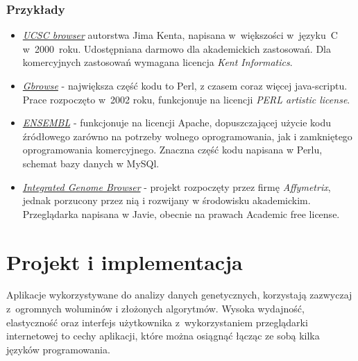 \documentclass[a4paper,12pt,oneside]{mwrep}  %
\begin{document}
\subsection{Przykłady}
\begin{itemize}
\item \href{https://genome.ucsc.edu}{\emph{UCSC browser}} \label{UCSC}
autorstwa Jima Kenta, napisana w~większości w~języku~C w~2000~roku. Udostępniana darmowo dla akademickich zastosowań. Dla komercyjnych zastosowań wymagana licencja \emph{Kent Informatics}.
\item \href{http://gbrowse.org}{\emph{Gbrowse}} - \label{Gbrowse}
największa część kodu to Perl, z czasem coraz więcej java-scriptu. Prace rozpoczęto w~2002 roku, funkcjonuje na licencji \emph{PERL artistic license}.
\item \href{http://www.ensembl.org}{\emph{ENSEMBL}} \label{ENSEMBL}
- funkcjonuje na licencji Apache, dopuszczającej użycie kodu źródłowego zarówno na potrzeby wolnego oprogramowania, jak i zamkniętego oprogramowania komercyjnego. Znaczna część kodu napisana w Perlu, schemat bazy danych w MySQl.
\item \href{http://bioviz.org/igb/index.html}{\emph{Integrated Genome Browser}} \label{IGB}
 - projekt rozpoczęty przez firmę \emph{Affymetrix}, jednak porzucony przez nią i rozwijany w środowisku akademickim. Przeglądarka napisana w Javie, obecnie na prawach Academic free license.
\end{itemize}

\chapter{Projekt i implementacja}
Aplikacje wykorzystywane do analizy danych genetycznych, korzystają zazwyczaj z~ogromnych woluminów i złożonych algorytmów. Wysoka wydajność, elastyczność oraz interfejs użytkownika z~wykorzystaniem przeglądarki internetowej to cechy aplikacji, które można osiągnąć łącząc ze sobą kilka języków programowania.
\cite{bioweb}
\end{document}

